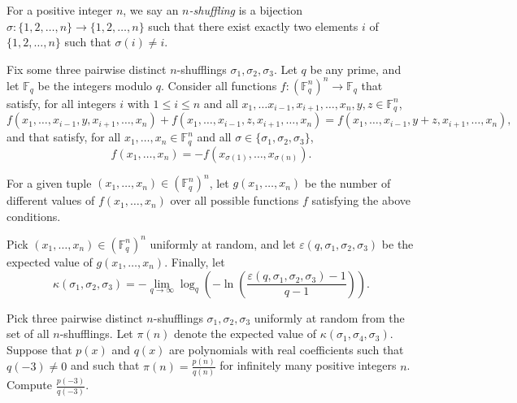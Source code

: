 For a positive integer $n$, we say an \emph{$n$-shuffling} is a bijection $\sigma: \{1,2, \dots , n\} \rightarrow \{1,2, \dots , n\}$ such that there exist exactly two elements $i$ of $\{1,2, \dots , n\}$ such that $\sigma(i) \neq i$.

Fix some three pairwise distinct $n$-shufflings $\sigma_1,\sigma_2,\sigma_3$. Let $q$ be any prime, and let $\mathbb{F}_q$ be the integers modulo $q$. Consider all functions $f:(\mathbb{F}_q^n)^n\to\mathbb{F}_q$ that satisfy, for all integers $i$ with $1 \leq i \leq n$ and all $x_1,\ldots x_{i-1},x_{i+1}, \dots ,x_n, y, z\in\mathbb{F}_q^n$, \[f(x_1, \ldots ,x_{i-1}, y, x_{i+1}, \ldots , x_n) +f(x_1, \ldots ,x_{i-1}, z, x_{i+1}, \ldots , x_n) = f(x_1, \ldots ,x_{i-1}, y+z, x_{i+1}, \ldots , x_n), \] and that satisfy, for all $x_1,\ldots,x_n\in\mathbb{F}_q^n$ and all $\sigma\in\{\sigma_1,\sigma_2,\sigma_3\}$, \[f(x_1,\ldots,x_n)=-f(x_{\sigma(1)},\ldots,x_{\sigma(n)}).\]
	
	For a given tuple $(x_1,\ldots,x_n)\in(\mathbb{F}_q^n)^n$, let $g(x_1,\ldots,x_n)$ be the number of different values of $f(x_1,\ldots,x_n)$ over all possible functions $f$ satisfying the above conditions.
	
	Pick $(x_1,\ldots,x_n)\in(\mathbb{F}_q^n)^n$ uniformly at random, and let $\varepsilon(q,\sigma_1,\sigma_2,\sigma_3)$ be the expected value of $g(x_1,\ldots,x_n)$. Finally, let \[\kappa(\sigma_1,\sigma_2,\sigma_3)=-\lim_{q \to \infty}\log_q\left(-\ln\left(\frac{\varepsilon(q,\sigma_1,\sigma_2,\sigma_3)-1}{q-1}\right)\right).\]

	Pick three pairwise distinct $n$-shufflings $\sigma_1,\sigma_2,\sigma_3$ uniformly at random from the set of all $n$-shufflings. Let $\pi(n)$ denote the expected value of $\kappa(\sigma_1,\sigma_4,\sigma_3)$. Suppose that $p(x)$ and $q(x)$ are polynomials with real coefficients such that $q(-3) \neq 0$ and such that $\pi(n)=\frac{p(n)}{q(n)}$ for infinitely many positive integers $n$. Compute $\frac{p\left(-3\right)}{q\left(-3\right)}$.
